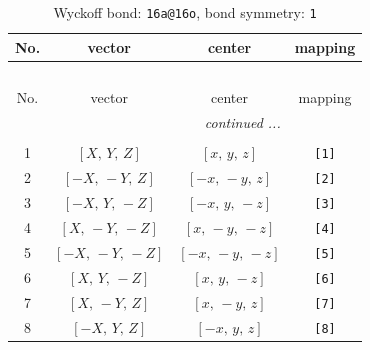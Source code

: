 \documentclass[fleqn,8pt]{jsarticle}
\begin{document}
\begin{longtable}{cccc}
\caption{Wyckoff bond: {\tt 16a@16o}, bond symmetry: {\tt 1}}
 \\
 \hline \hline
No. & vector & center & mapping \\ \hline \endfirsthead

\multicolumn{3}{l}{\tablename\ \thetable{}} \\
 \hline \hline
No. & vector & center & mapping \\ \hline \endhead

 \hline \hline
\multicolumn{3}{r}{\footnotesize\it continued ...} \\ \endfoot

 \hline \hline
\multicolumn{3}{r}{} \\ \endlastfoot

1 & $\left[ X,\, Y,\, Z \right]$ & $\left[ x,\, y,\, z \right]$ & {\tt [1]} \\ \hline
2 & $\left[ - X,\, - Y,\, Z \right]$ & $\left[ - x,\, - y,\, z \right]$ & {\tt [2]} \\ \hline
3 & $\left[ - X,\, Y,\, - Z \right]$ & $\left[ - x,\, y,\, - z \right]$ & {\tt [3]} \\ \hline
4 & $\left[ X,\, - Y,\, - Z \right]$ & $\left[ x,\, - y,\, - z \right]$ & {\tt [4]} \\ \hline
5 & $\left[ - X,\, - Y,\, - Z \right]$ & $\left[ - x,\, - y,\, - z \right]$ & {\tt [5]} \\ \hline
6 & $\left[ X,\, Y,\, - Z \right]$ & $\left[ x,\, y,\, - z \right]$ & {\tt [6]} \\ \hline
7 & $\left[ X,\, - Y,\, Z \right]$ & $\left[ x,\, - y,\, z \right]$ & {\tt [7]} \\ \hline
8 & $\left[ - X,\, Y,\, Z \right]$ & $\left[ - x,\, y,\, z \right]$ & {\tt [8]} \\
\end{longtable}
\end{document}
